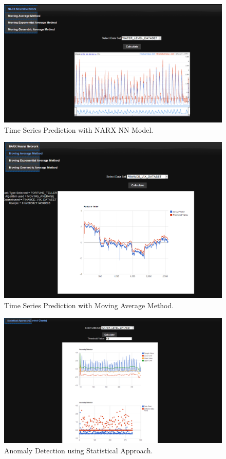 \documentclass[12pt]{report}
\begin{document}
\begin{figure}[h!]
  
  \centering
    \includegraphics[scale=0.40]{./screenshots/ft_narx.png}
\caption{Time Series Prediction with NARX NN Model.}
\end{figure}
\begin{figure}[h!]
  
  \centering
    \includegraphics[scale=0.400]{./screenshots/ft_mv_avg.png}
\caption{Time Series Prediction with Moving Average Method.}
\end{figure}

\begin{figure}[h!]
  
  \centering
    \includegraphics[scale=0.350]{./screenshots/ano_stat_app.png}
\caption{Anomaly Detection using Statistical Approach.}
\end{figure}
\end{document}
